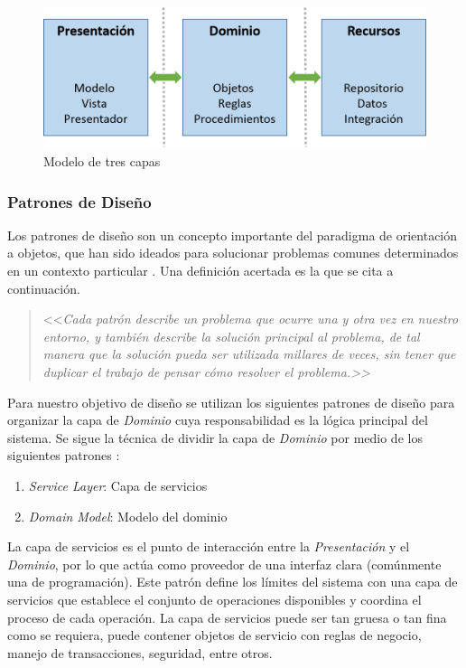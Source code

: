 \begin{figure}[H]
\begin{centering}
\includegraphics[width=0.8\columnwidth]{capitulo-5/graphics/arqui_tres_capas}
\par\end{centering}
\caption[Modelo de tres capas]{\label{fig5:tres_capas}Modelo de tres capas}

\end{figure}


\subsubsection{Patrones de Diseño}

Los patrones de diseño son un concepto importante del paradigma de
orientación a objetos, que han sido ideados para solucionar problemas
comunes determinados en un contexto particular \cite{Shalloway2004}.
Una definición acertada es la que se cita a continuación.
\begin{quotation}
<<\emph{Cada patrón describe un problema que ocurre una y otra vez
en nuestro entorno, y también describe la solución principal al problema,
de tal manera que la solución pueda ser utilizada millares de veces,
sin tener que duplicar el trabajo de pensar cómo resolver el problema.>>}
\cite{Alexander1977}
\end{quotation}
Para nuestro objetivo de diseño se utilizan los siguientes patrones
de diseño para organizar la capa de \emph{Dominio} cuya responsabilidad
es la lógica principal del sistema. Se sigue la técnica de dividir
la capa de\emph{ Dominio} por medio de los siguientes patrones \cite{Fowler2002}:
\begin{enumerate}
\item \emph{Service Layer}: Capa de servicios
\item \emph{Domain Model}: Modelo del dominio
\end{enumerate}
La capa de servicios es el punto de interacción entre la \emph{Presentación}
y el\emph{ Dominio}, por lo que actúa como proveedor de una interfaz
clara (comúnmente una  de programación). Este patrón define
los límites del sistema con una capa de servicios que establece el
conjunto de operaciones disponibles y coordina el proceso de cada
operación. La capa de servicios puede ser tan gruesa o tan fina como
se requiera, puede contener objetos de servicio con reglas de negocio,
manejo de transacciones, seguridad, entre otros.

